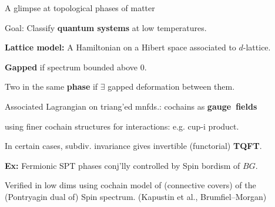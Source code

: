 \begin{frame}{A glimpse at topological phases of matter}

	\vspace*{-5pt}

	\textcolor{pblue}{Goal:} Classify \textbf{quantum systems} at low temperatures.

	\smallskip\pause

	\textbf{Lattice model:} A Hamiltonian on a Hibert space associated to $d$-lattice.

	\smallskip\pause

	\textbf{Gapped} if spectrum bounded above $0$.

	\smallskip\pause

	Two in the same \textbf{phase} if $\exists$ gapped deformation between them.

	\smallskip\pause

	Associated Lagrangian on triang'ed mnfds.: cochains as \textbf{gauge~fields}

	\smallskip\pause

	using finer cochain structures for interactions: e.g. cup-i product.

	\smallskip\pause

	In certain cases, subdiv. invariance gives invertible (functorial) \textbf{TQFT}.

	\smallskip\pause

	\textbf{Ex:} Fermionic SPT phases conj'lly controlled by Spin bordism of $BG$.

	\smallskip\pause

	Verified in low dims using cochain model of (connective covers) of the (Pontryagin dual of) Spin spectrum. (Kapustin et al., Brumfiel--Morgan)

	\smallskip\pause


\end{frame}